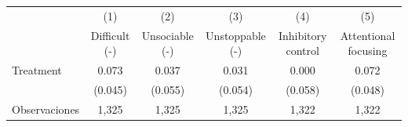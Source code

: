 {
\def\sym#1{\ifmmode^{#1}\else\(^{#1}\)\fi}
\begin{tabular}{l*{5}{c}}
\toprule
                    &\multicolumn{1}{c}{(1)}&\multicolumn{1}{c}{(2)}&\multicolumn{1}{c}{(3)}&\multicolumn{1}{c}{(4)}&\multicolumn{1}{c}{(5)}\\
                    &\multicolumn{1}{c}{Difficult (-)}&\multicolumn{1}{c}{Unsociable (-)}&\multicolumn{1}{c}{Unstoppable (-)}&\multicolumn{1}{c}{Inhibitory control}&\multicolumn{1}{c}{Attentional focusing}\\
\midrule
Treatment           &       0.073         &       0.037         &       0.031         &       0.000         &       0.072         \\
                    &     (0.045)         &     (0.055)         &     (0.054)         &     (0.058)         &     (0.048)         \\
\midrule
Observaciones       &       1,325         &       1,325         &       1,325         &       1,322         &       1,322         \\
\bottomrule
\end{tabular}
}
